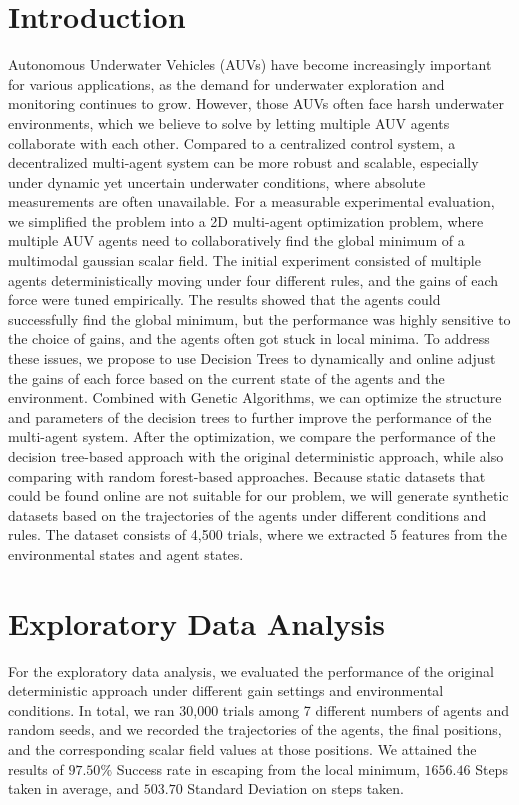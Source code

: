 \documentclass[11pt]{article}
\begin{document}
\section{Introduction}
Autonomous Underwater Vehicles (AUVs) have become increasingly important for various applications, as the demand for underwater exploration and monitoring continues to grow.
However, those AUVs often face harsh underwater environments, which we believe to solve by letting multiple AUV agents collaborate with each other.
Compared to a centralized control system, a decentralized multi-agent system can be more robust and scalable, especially under dynamic yet uncertain underwater conditions, where absolute measurements are often unavailable.
For a measurable experimental evaluation, we simplified the problem into a 2D multi-agent optimization problem, where multiple AUV agents need to collaboratively find the global minimum of a multimodal gaussian scalar field.
The initial experiment consisted of multiple agents deterministically moving under four different rules, and the gains of each force were tuned empirically.
The results showed that the agents could successfully find the global minimum, but the performance was highly sensitive to the choice of gains, and the agents often got stuck in local minima.
To address these issues, we propose to use Decision Trees to dynamically and online adjust the gains of each force based on the current state of the agents and the environment.
Combined with Genetic Algorithms, we can optimize the structure and parameters of the decision trees to further improve the performance of the multi-agent system.
After the optimization, we compare the performance of the decision tree-based approach with the original deterministic approach, while also comparing with random forest-based approaches.
Because static datasets that could be found online are not suitable for our problem, we will generate synthetic datasets based on the trajectories of the agents under different conditions and rules.
The dataset consists of 4,500 trials, where we extracted 5 features from the environmental states and agent states.

\section{Exploratory Data Analysis}

For the exploratory data analysis, we evaluated the performance of the original deterministic approach under different gain settings and environmental conditions.
In total, we ran 30,000 trials among 7 different numbers of agents and random seeds, and we recorded the trajectories of the agents, the final positions, and the corresponding scalar field values at those positions.
We attained the results of $97.50\%$ Success rate in escaping from the local minimum, $1656.46$ Steps taken in average, and $503.70$ Standard Deviation on steps taken.
\end{document}

